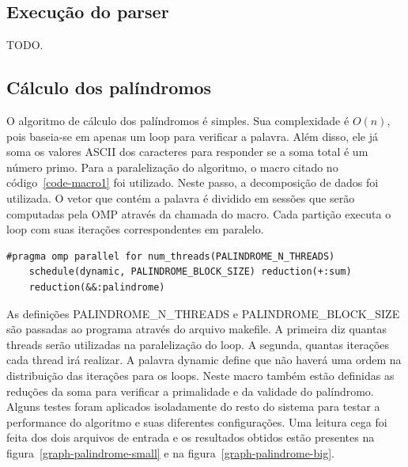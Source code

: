 \documentclass[a4paper]{article}
\begin{document}
\subsection{Execução do parser}
\indent \indent TODO.

\subsection{Cálculo dos palíndromos}
\indent \indent O algoritmo de cálculo dos palíndromos é simples. Sua complexidade é \begin{math}O(n)\end{math}, pois baseia-se em apenas um loop para verificar a palavra. Além disso, ele já soma os valores ASCII dos caracteres para responder se a soma total é um número primo. Para a paralelização do algoritmo, o macro citado no código~\ref{code-macro1} foi utilizado. Neste passo, a decomposição de dados foi utilizada. O vetor que contém a palavra é dividido em sessões que serão computadas pela OMP através da chamada do macro. Cada partição executa o loop com suas iterações correspondentes em paralelo.
\begin{lstlisting}[caption=Macro que paraleliza o algoritmo do palíndromo, float=h, label=code-macro1]
#pragma omp parallel for num_threads(PALINDROME_N_THREADS) 
	schedule(dynamic, PALINDROME_BLOCK_SIZE) reduction(+:sum) 
	reduction(&&:palindrome)
\end{lstlisting}
As definições PALINDROME\_N\_THREADS e PALINDROME\_BLOCK\_SIZE são passadas ao programa através do arquivo makefile. A primeira diz quantas threads serão utilizadas na paralelização do loop. A segunda, quantas iterações cada thread irá realizar. A palavra dynamic define que não haverá uma ordem na distribuição das iterações para os loops. Neste macro também estão definidas as reduções da soma para verificar a primalidade e da validade do palíndromo.\\
\indent Alguns testes foram aplicados isoladamente do resto do sistema para testar a performance do algoritmo e suas diferentes configurações. Uma leitura cega foi feita dos dois arquivos de entrada e os resultados obtidos estão presentes na figura~\ref{graph-palindrome-small} e na figura~\ref{graph-palindrome-big}.
\end{document}
